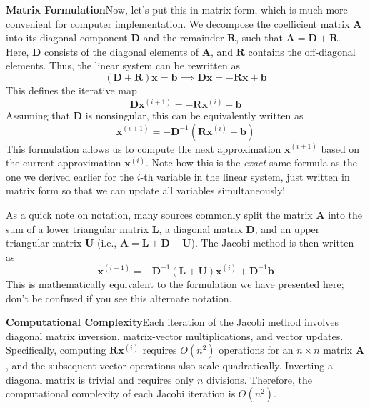 \textbf{Matrix Formulation}\quad Now, let's put this in matrix form, which is much more convenient for computer implementation. We decompose the coefficient matrix $\mathbf{A}$ into its diagonal component $\mathbf{D}$ and the remainder $\mathbf{R}$, such that $\mathbf{A} = \mathbf{D} + \mathbf{R}$. Here, $\mathbf{D}$ consists of the diagonal elements of $\mathbf{A}$, and $\mathbf{R}$ contains the off-diagonal elements. Thus, the linear system can be rewritten as
\begin{equation*}
    \left( \mathbf{D} + \mathbf{R} \right)\mathbf{x} = \mathbf{b}
    \implies
    \mathbf{D}\mathbf{x} = -\mathbf{R}\mathbf{x} + \mathbf{b}
\end{equation*}
This defines the iterative map
\begin{equation*}
    \mathbf{D}\mathbf{x}^{(i+1)} = -\mathbf{R}\mathbf{x}^{(i)} + \mathbf{b}
\end{equation*}
Assuming that $\mathbf{D}$ is nonsingular, this can be equivalently written as
\begin{equation*}
    \mathbf{x}^{(i+1)} = -\mathbf{D}^{-1}(\mathbf{R}\mathbf{x}^{(i)} - \mathbf{b})
\end{equation*}
This formulation allows us to compute the next approximation $\mathbf{x}^{(i+1)}$ based on the current approximation $\mathbf{x}^{(i)}$. Note how this is the \textit{exact} same formula as the one we derived earlier for the $i$-th variable in the linear system, just written in matrix form so that we can update all variables simultaneously!

As a quick note on notation, many sources commonly split the matrix $\mathbf{A}$ into the sum of a lower triangular matrix $\mathbf{L}$, a diagonal matrix $\mathbf{D}$, and an upper triangular matrix $\mathbf{U}$ (i.e., $\mathbf{A} = \mathbf{L} + \mathbf{D} + \mathbf{U}$). The Jacobi method is then written as
\begin{equation*}
    \mathbf{x}^{(i+1)} = -\mathbf{D}^{-1}(\mathbf{L} + \mathbf{U})\mathbf{x}^{(i)} + \mathbf{D}^{-1}\mathbf{b}
\end{equation*}
This is mathematically equivalent to the formulation we have presented here; don't be confused if you see this alternate notation.

\textbf{Computational Complexity}\quad Each iteration of the Jacobi method involves diagonal matrix inversion, matrix-vector multiplications, and vector updates. Specifically, computing $\mathbf{R}\mathbf{x}^{(i)}$ requires $O(n^2)$ operations for an $n \times n$ matrix $\mathbf{A}$, and the subsequent vector operations also scale quadratically. Inverting a diagonal matrix is trivial and requires only $n$ divisions. Therefore, the computational complexity of each Jacobi iteration is $O(n^2)$.

